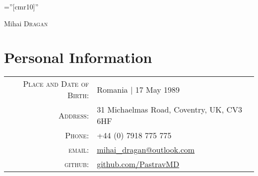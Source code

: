 \documentclass[a4paper,10pt]{article}
\begin{document}
\pagestyle{empty} %

\font\fb=''[cmr10]'' %

\par{\centering
		{\Huge Mihai \textsc{Dragan}
	}\bigskip\par}

\section{Personal Information}

\begin{tabular}{rl}
    \textsc{Place and Date of Birth:} & Romania  | 17 May 1989 \\
    \textsc{Address:}   & 31 Michaelmas Road, Coventry, UK, CV3 6HF \\
    \textsc{Phone:}     & +44 (0) 7918 775 775\\
    \textsc{email:}     & \href{mailto:mihai_dragan@outlook.com}{mihai\_dragan@outlook.com}\\
    \textsc{github:}    & \href{https://github.com/PastravMD}{github.com/PastravMD}
\end{tabular}

\end{document}
